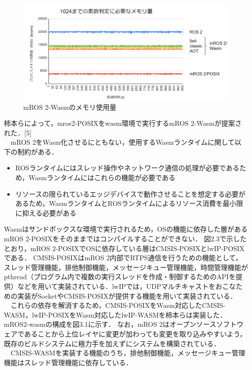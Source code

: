 \begin{figure}[ht]
    \centering
    \includegraphics[width=13cm]{images/fig3_mros2-wasm_memory.png}
    \caption{mROS 2-Wasmのメモリ使用量}
    \label{fig:mros2-wasm_configuration}
\end{figure}
柿本らによって，mros2-POSIXをwasm環境で実行するmROS 2-Wasmが提案された．[5]
\\　mROS 2をWasm化させるにともない，使用するWasmランタイムに関して以下の制約がある．
\begin{itemize}
    \item ROSランタイムにはスレッド操作やネットワーク通信の処理が必要であるため，Wasmランタイムにはこれらの機能が必要である
    \item リソースの限られているエッジデバイスで動作させることを想定する必要があるため，WasmランタイムとROSランタイムによるリソース消費を最小限に抑える必要がある
\end{itemize}
Wasmはサンドボックスな環境で実行されるため，OSの機能に依存した層があるmROS 2-POSIXをそのままではコンパイルすることができない．
図2.3で示したとおり，mROS 2-POSIXでOSに依存している層はCMSIS-POSIXとlwIP-POSIXである．
CMSIS-POSIXはmROS 2内部でRTPS通信を行うための機能として，スレッド管理機能，排他制御機能，メッセージキュー管理機能，時間管理機能がpthread（プログラム内で複数の実行スレッドを作成・制御するためのAPIを提供）などを用いて実装されている．lwIPでは，UDPマルチキャストをおこなための実装がSocketやCMSIS-POSIXが提供する機能を用いて実装されている．
\\　これらの依存を解消するため，CMSIS-POSIXをWasm対応したCMSIS-WASM，lwIP-POSIXをWasm対応したlwIP-WASMを柿本らは実装した．
mROS2-wasmの構成を図3.1に示す．
なお，mROS 2はオープンソースソフトウェアであることから上位レイヤに変更が加わっても変更を取り込みやすいよう，既存のビルドシステムに極力手を加えずにシステムを構築されている．
\\　CMSIS-WASMを実装する機能のうち，排他制御機能，メッセージキュー管理機能はスレッド管理機能に依存している．
